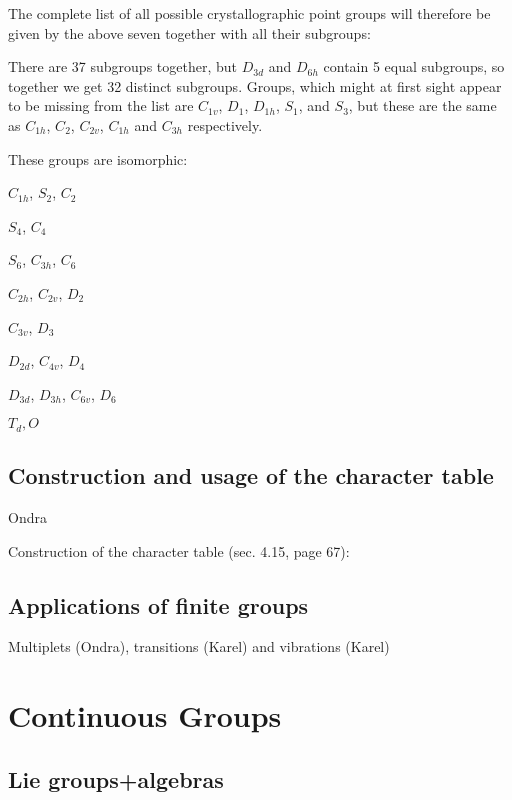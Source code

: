 The complete list of all possible crystallographic point groups will therefore
be given by the above seven together with all their subgroups:


There are 37 subgroups together, but $D_{3d}$ and $D_{6h}$ contain 5 equal
subgroups, so together we get 32 distinct subgroups. Groups, which might at
first sight appear to be missing from the list are $C_{1v}$, $D_1$, $D_{1h}$,
$S_1$, and $S_3$, but these are the same as $C_{1h}$, $C_2$, $C_{2v}$, $C_{1h}$
and $C_{3h}$ respectively.

These groups are isomorphic: 

$C_{1h}$, $S_2$, $C_2$

$S_4$, $C_4$

$S_6$, $C_{3h}$, $C_6$

$C_{2h}$, $C_{2v}$, $D_2$

$C_{3v}$, $D_3$

$D_{2d}$, $C_{4v}$, $D_4$

$D_{3d}$, $D_{3h}$, $C_{6v}$, $D_6$

$T_d, O$

\section{Construction and usage of the character table}

Ondra

Construction of the character table \cite{elliott} (sec. 4.15, page 67):

\section{Applications of finite groups}

Multiplets (Ondra), transitions (Karel) and vibrations (Karel)




\chapter{Continuous Groups}

\section{Lie groups+algebras}

